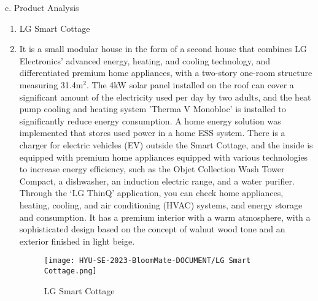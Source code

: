 \documentclass[conference, a4paper]{IEEEtran}
\begin{document}
\indent c. Product Analysis
\begin{enumerate}
\item LG Smart Cottage
\item[] It is a small modular house in the form of a second house that combines LG Electronics' advanced energy, heating, and cooling technology, and differentiated premium home appliances, with a two-story one-room structure measuring 31.4m$^2$.
The 4kW solar panel installed on the roof can cover a significant amount of the electricity used per day by two adults, and the heat pump cooling and heating system 'Therma V Monobloc' is installed to significantly reduce energy consumption. A home energy solution was implemented that stores used power in a home ESS system. There is a charger for electric vehicles (EV) outside the Smart Cottage, and the inside is equipped with premium home appliances equipped with various technologies to increase energy efficiency, such as the Objet Collection Wash Tower Compact, a dishwasher, an induction electric range, and a water purifier. Through the ‘LG ThinQ’ application, you can check home appliances, heating, cooling, and air conditioning (HVAC) systems, and energy storage and consumption. It has a premium interior with a warm atmosphere, with a sophisticated design based on the concept of walnut wood tone and an exterior finished in light beige. \\
\newpage
\begin{figure}[h]
\texttt{[image: HYU-SE-2023-BloomMate-DOCUMENT/LG Smart Cottage.png]}
\label{fig:LGsmartcottage}
\caption{LG Smart Cottage} 
\end{figure}


\end{enumerate}
\end{document}
